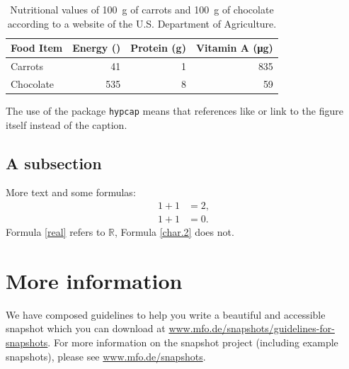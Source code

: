 \documentclass{snapshotmfo}
\begin{document}
\begin{center}
	\begin{table}[ht]
		\centering
		\begin{tabular}{@{}lrrr@{}}\toprule
			\textbf{Food Item}  & \textbf{Energy} (\si{\kcal}) & \textbf{Protein} (\si{\gram}) & \textbf{Vitamin A} (\si{\micro\gram}) \\
			\midrule
			Carrots   & 41  & 1 & 835 \\
			Chocolate & 535 & 8 & 59  \\
			\bottomrule
		\end{tabular}
		\caption{Nutritional values of \SI{100}{\gram} of carrots and \SI{100}{\gram} of chocolate according to a website of the U.S. Department of Agriculture. }
		\label{tab:nutrition}
	\end{table}
\end{center}

The use of the package \texttt{hypcap} means that references like
 or  link to the figure itself instead of the caption.

\subsection{A subsection}
More text and some formulas:
\begin{align}\label{real}
1+1&=2,\\\label{char.2}
1+1&=0.
\end{align}
Formula \eqref{real} refers to $\mathbb{R}$, Formula \eqref{char.2} does not.

\section{More information}
We have composed guidelines to help you write a beautiful and accessible snapshot which you can download at \href{https://www.mfo.de/snapshots/guidelines-for-snapshots}{www.mfo.de/snapshots/guidelines-for-snapshots}. For more information on the snapshot project (including example snapshots), please see \href{https://www.mfo.de/snapshots}{www.mfo.de/snapshots}.
\end{document}
